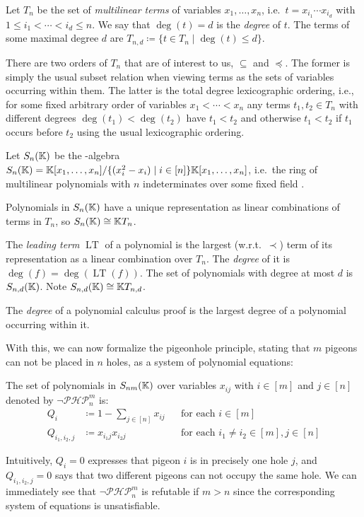 \documentclass{article}
\newcommand{\Sn}{S_n(\KK)}
\newcommand{\Snd}{S_{n, d}(\KK)}
\newcommand{\PHP}{\ensuremath{\neg \mathcal{PHP}^m_n}\xspace}
\newcommand{\Qiij}{Q_{i_1, i_2, j}}
\newcommand{\LT}{\operatorname{LT}}
\begin{document}
\begin{definition}
    Let $T_n$ be the set of \textit{multilinear terms} of variables $x_1, \ldots, x_n$, i.e.\ $t = x_{i_1} \cdots x_{i_d}$ with $1 \leq i_1 < \cdots < i_d \leq n$. We say that $\deg(t) = d$ is the \textit{degree} of $t$. The terms of some maximal degree $d$ are $T_{n, d} \coloneqq \{t \in T_n \mid \deg(t) \leq d\}$.
\end{definition}

There are two orders of $T_n$ that are of interest to us, $\subseteq$ and $\preceq$. The former is simply the usual subset relation when viewing terms as the sets of variables occurring within them. The latter is the total degree lexicographic ordering, i.e., for some fixed arbitrary order of variables $x_1 < \cdots < x_n$ any terms $t_1, t_2 \in T_n$ with different degrees $\deg(t_1) < \deg(t_2)$ have $t_1 < t_2$ and otherwise $t_1 < t_2$ if $t_1$ occurs before $t_2$ using the usual lexicographic ordering.

\begin{definition}
    Let $\Sn$ be the \KK-algebra $\Sn = \KK[x_1, \ldots, x_n] / \{(x_i^2 - x_i) \mid i \in [n] \}\KK[x_1, \ldots, x_n]$, i.e.\ the ring of multilinear polynomials with $n$ indeterminates over some fixed field \KK.
\end{definition}
Polynomials in $\Sn$ have a unique representation as linear combinations of terms in $T_n$, so $\Sn \cong \KK T_n$.
\begin{definition}
    The \textit{leading term} $\LT$ of a polynomial is the largest (w.r.t.\ $\prec$) term of its representation as a linear combination over $T_n$. The \textit{degree} of it is $\deg(f) = \deg(\LT(f))$. The set of polynomials with degree at most $d$ is $\Snd$. Note $\Snd \cong \KK T_{n, d}$.
\end{definition}
The \textit{degree} of a polynomial calculus proof is the largest degree of a polynomial occurring within it.

With this, we can now formalize the pigeonhole principle, stating that $m$ pigeons can not be placed in $n$ holes, as a system of polynomial equations:
\begin{definition}[\PHP]
    The set of polynomials in $S_{nm}(\mathbb{K})$ over variables $x_{ij}$ with $i \in [m]$ and $j \in [n]$ denoted by \PHP is:
    \begin{align}
        Q_i &\coloneqq 1 - \sum_{j \in [n]} x_{ij} &&\text{for each $i \in [m]$}\\
        \Qiij &\coloneqq x_{i_1j} x_{i_2j} &&\text{for each $i_1 \neq i_2 \in [m], j \in [n]$}
    \end{align}
\end{definition}
Intuitively, $Q_i = 0$ expresses that pigeon $i$ is in precisely one hole $j$, and $\Qiij = 0$ says that two different pigeons can not occupy the same hole. We can immediately see that $\PHP$ is refutable if $m > n$ since the corresponding system of equations is unsatisfiable.
\end{document}
